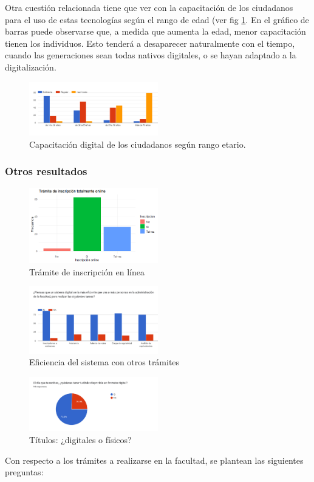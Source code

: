 \documentclass[a4paper]{article}
\begin{document}
Otra cuestión relacionada tiene que ver con la capacitación de los ciudadanos para el uso de estas tecnologías según el rango de edad (ver fig \ref{fig:Imagen4}. En el gráfico de barras puede observarse que, a medida que aumenta la edad, menor capacitación tienen los individuos. Esto tenderá a desaparecer naturalmente con el tiempo, cuando las generaciones sean todas nativos digitales, o se hayan adaptado a la digitalización.

\begin{figure}
\centering
\includegraphics[width=0.5\textwidth]{Imagen4.png}
\caption{\label{fig:Imagen4}Capacitación digital de los ciudadanos según rango etario.}
\end{figure}

\subsubsection{Otros resultados}
\begin{figure}
\centering
\includegraphics[width=0.5\textwidth]{Imagen5.png}
\caption{\label{fig:Imagen5}Trámite de inscripción en línea}
\end{figure}
\begin{figure}
\centering
\includegraphics[width=0.5\textwidth]{Imagen6.png}
\caption{\label{fig:Imagen6}Eficiencia del sistema con otros trámites}
\end{figure}
\begin{figure}
\centering
\includegraphics[width=0.5\textwidth]{Imagen7.png}
\caption{\label{fig:Imagen7}Títulos: ¿digitales o físicos?}
\end{figure}
Con respecto a los trámites a realizarse en la facultad, se plantean las siguientes preguntas:
\end{document}

